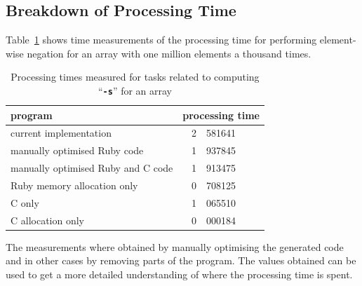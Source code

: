 \documentclass[12pt,a4paper,oneside,openright]{book}
\newcommand{\tbl}[1]{Table~\ref{tbl:#1}}
\newcommand{\code}[1]{``\texttt{\textbf{\textcolor{codegray}{\small{#1}}}}''}
\begin{document}
\begin{CJK}{UTF8}{}
\subsection{Breakdown of Processing Time}\label{cha:breakdown}
\tbl{perf} shows time measurements of the processing time for performing element-wise negation for an array with one million elements a thousand times.
\begin{table}[htbp]
  \begin{center}
    \caption{Processing times measured for tasks related to computing \code{-s} for an array\label{tbl:perf}}\vspace{1em}
    \begin{tabular}{lr@{.}l@{s}}\toprule
      \textbf{program} & \multicolumn{2}{l}{\textbf{processing time}}\\\midrule
      current implementation             & 2&581641\\
      manually optimised Ruby code       & 1&937845\\
      manually optimised Ruby and C code & 1&913475\\
      Ruby memory allocation only        & 0&708125\\\midrule
      C only                             & 1&065510\\
      C allocation only                  & 0&000184\\\bottomrule
    \end{tabular}
  \end{center}
\end{table}
The measurements where obtained by manually optimising the generated code and in other cases by removing parts of the program. The values obtained can be used to get a more detailed understanding of where the processing time is spent.


\end{CJK}
\end{document}
